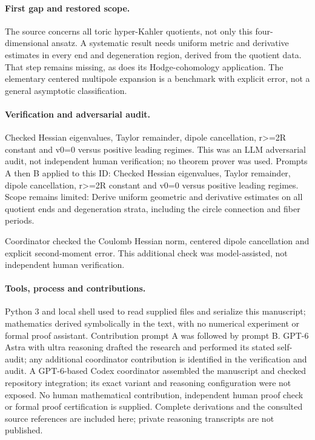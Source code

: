 \documentclass[11pt]{article}
\begin{document}
\paragraph{First gap and restored scope.}The source concerns all toric hyper-Kahler quotients, not only this four-dimensional ansatz. A systematic result needs uniform metric and derivative estimates in every end and degeneration region, derived from the quotient data. That step remains missing, as does its Hodge-cohomology application. The elementary centered multipole expansion is a benchmark with explicit error, not a general asymptotic classification.

\paragraph{Verification and adversarial audit.}
Checked Hessian eigenvalues, Taylor remainder, dipole cancellation, r>=2R constant and v0=0 versus positive leading regimes. This was an LLM adversarial audit, not independent human verification; no theorem prover was used. Prompts A then B applied to this ID: Checked Hessian eigenvalues, Taylor remainder, dipole cancellation, r>=2R constant and v0=0 versus positive leading regimes. Scope remains limited: Derive uniform geometric and derivative estimates on all quotient ends and degeneration strata, including the circle connection and fiber periods.

Coordinator checked the Coulomb Hessian norm, centered dipole cancellation and explicit second-moment error. This additional check was model-assisted, not independent human verification.

\paragraph{Tools, process and contributions.}
Python 3 and local shell used to read supplied files and serialize this manuscript; mathematics derived symbolically in the text, with no numerical experiment or formal proof assistant. Contribution prompt A was followed by prompt B. GPT-6 Astra with ultra reasoning drafted the research and performed its stated self-audit; any additional coordinator contribution is identified in the verification and audit. A GPT-6-based Codex coordinator assembled the manuscript and checked repository integration; its exact variant and reasoning configuration were not exposed. No human mathematical contribution, independent human proof check or formal proof certification is supplied. Complete derivations and the consulted source references are included here; private reasoning transcripts are not published.
\end{document}
